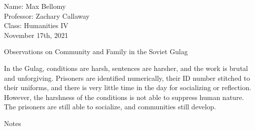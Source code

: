 \documentclass[12pt]{article}
\begin{document}
\begin{flushleft}

Name: Max Bellomy\\
Professor: Zachary Callaway\\
Class: Humanities IV\\
November 17th, 2021\\

\begin{center}
Observations on Community and Family in the Soviet Gulag
\end{center}


\setlength{\parindent}{0.5in}


In the Gulag, conditions are harsh, sentences are harsher, and the work is brutal and unforgiving.
Prisoners are identified numerically, their ID number stitched to their uniforms, and there is very little time in the day for socializing or reflection.
However, the harshness of the conditions is not able to suppress human nature. The prisoners are still able to socialize, and communities still develop.







\begin{center}
Notes
\end{center}


\setlength{\parindent}{0.5in}

\end{flushleft}
\end{document}
